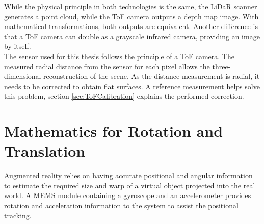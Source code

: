 While the physical principle in both technologies is the same, the LiDaR scanner generates a point cloud, while the ToF camera outputs a depth map image. With mathematical transformations, both outputs are equivalent. Another difference is that a ToF camera can double as a grayscale infrared camera, providing an image by itself.  \\
The sensor used for this thesis follows the principle of a ToF camera. The measured radial distance from the sensor for each pixel allows the three-dimensional reconstruction of the scene. As the distance measurement is radial, it needs to be corrected to obtain flat surfaces. A reference measurement helps solve this problem, section \ref{sec:ToFCalibration} explains the performed correction.

\section{Mathematics for Rotation and Translation}
\label{sec:LinAlgRotation}
Augmented reality relies on having accurate positional and angular information to estimate the required size and warp of a virtual object projected into the real world. A MEMS module containing a gyroscope and an accelerometer provides rotation and acceleration information to the system to assist the positional tracking.
